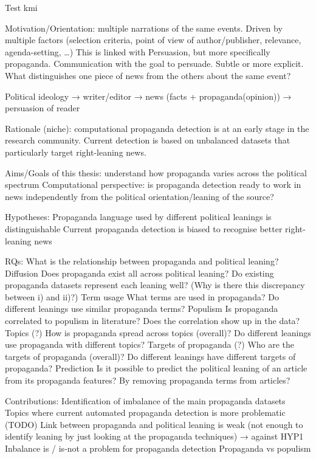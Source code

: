 Test
\acrshort{kmi}


Motivation/Orientation: multiple narrations of the same events. Driven by multiple factors (selection criteria, point of view of author/publisher, relevance, agenda-setting, …)
This is linked with Persuasion, but more specifically propaganda. Communication with the goal to persuade. Subtle or more explicit.
What distinguishes one piece of news from the others about the same event? 

Political ideology → writer/editor → news (facts + propaganda(opinion)) → persuasion of reader

Rationale (niche): computational propaganda detection is at an early stage in the research community. Current detection is based on unbalanced datasets that particularly target right-leaning news.

Aims/Goals of this thesis: 
understand how propaganda varies across the political spectrum
Computational perspective: is propaganda detection ready to work in news independently from the political orientation/leaning of the source?

Hypotheses:
Propaganda language used by different political leanings is distinguishable
 Current propaganda detection is biased to recognise better right-leaning news



RQs:
What is the relationship between propaganda and political leaning?
Diffusion
Does propaganda exist all across political leaning?
Do existing propaganda datasets represent each leaning well?
(Why is there this discrepancy between i) and ii)?)
Term usage
What terms are used in propaganda?
Do different leanings use similar propaganda terms?
Populism
Is propaganda correlated to populism in literature?
Does the correlation show up in the data?
Topics (?)
How is propaganda spread across topics (overall)?
Do different leanings use propaganda with different topics?
Targets of propaganda (?)
Who are the targets of propaganda (overall)?
Do different leanings have different targets of propaganda?
Prediction
Is it possible to predict the political leaning of an article from its propaganda features?
By removing propaganda terms from articles? 

Contributions:
Identification of imbalance of the main propaganda datasets
Topics where current automated propaganda detection is more problematic (TODO) 
Link between propaganda and political leaning is weak (not enough to identify leaning by just looking at the propaganda techniques) → against HYP1
Inbalance is / is-not a problem for propaganda detection
Propaganda vs populism
